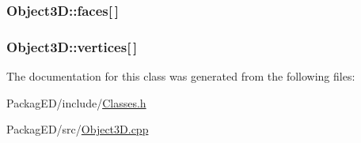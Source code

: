 \subsubsection[{\texorpdfstring{faces}{faces}}]{ Object3\+D\+::faces\mbox{[}$\,$\mbox{]}}\hypertarget{class_object3_d_a4cc7f57059a990a8573a7644a4d3ab2a}{}\label{class_object3_d_a4cc7f57059a990a8573a7644a4d3ab2a}
\subsubsection[{\texorpdfstring{vertices}{vertices}}]{ Object3\+D\+::vertices\mbox{[}$\,$\mbox{]}}\hypertarget{class_object3_d_a23cc82ea4ef0af8e0e22871bdbdba6c6}{}\label{class_object3_d_a23cc82ea4ef0af8e0e22871bdbdba6c6}


The documentation for this class was generated from the following files\+:\begin{DoxyCompactItemize}
\item 
Packag\+E\+D/include/\hyperlink{_classes_8h}{Classes.\+h}\item 
Packag\+E\+D/src/\hyperlink{_object3_d_8cpp}{Object3\+D.\+cpp}\end{DoxyCompactItemize}
